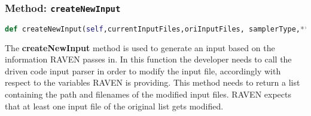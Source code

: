 \subsubsection{Method: \texttt{createNewInput}}
\label{subsubsec:createNewInput}
\begin{lstlisting}[language=python]
def createNewInput(self,currentInputFiles,oriInputFiles, samplerType,**Kwargs)
\end{lstlisting}
The \textbf{createNewInput} method is used to generate an input based
on the information RAVEN passes in. In this function the developer needs to
call the driven code input parser in order to modify the input file, accordingly with
respect to the variables RAVEN is providing. This method needs to return a list containing
the path and filenames of the modified input files. \nb RAVEN expects that at least one input
file of the original list gets modified.

